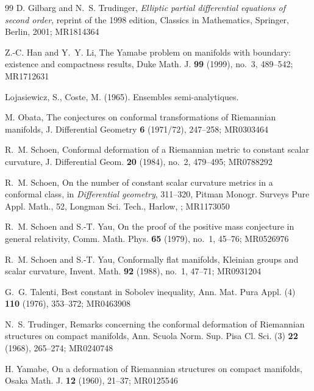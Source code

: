 \documentclass[12pt]{amsart}
\begin{document}
\begin{thebibliography}{99}
     D. Gilbarg and N.~S. Trudinger, {\it Elliptic partial differential equations of second order}, reprint of the 1998 edition, 
Classics in Mathematics, Springer, Berlin, 2001; MR1814364

     Z.-C. Han and Y.~Y. Li, The Yamabe problem on manifolds with boundary: existence and compactness results, Duke Math. J. {\bf 99} (1999), no.~3, 489--542; MR1712631

     Lojasiewicz, S.,  Coste, M. (1965). Ensembles semi-analytiques.

     M. Obata, The conjectures on conformal transformations of Riemannian manifolds, J. Differential Geometry {\bf 6} (1971/72), 247--258; MR0303464

     R.~M. Schoen, Conformal deformation of a Riemannian metric to constant scalar curvature, J. Differential Geom. {\bf 20} (1984), no.~2, 479--495; MR0788292

     R.~M. Schoen, On the number of constant scalar curvature metrics in a conformal class, in {\it Differential geometry}, 311--320, Pitman Monogr. Surveys Pure Appl. Math., 52, Longman Sci. Tech., Harlow, ; MR1173050

     R.~M. Schoen and S.-T. Yau, On the proof of the positive mass conjecture in general relativity, Comm. Math. Phys. {\bf 65} (1979), no.~1, 45--76; MR0526976

     R.~M. Schoen and S.-T. Yau, Conformally flat manifolds, Kleinian groups and scalar curvature, Invent. Math. {\bf 92} (1988), no.~1, 47--71; MR0931204

     G.~G. Talenti, Best constant in Sobolev inequality, Ann. Mat. Pura Appl. (4) {\bf 110} (1976), 353--372; MR0463908

     N.~S. Trudinger, Remarks concerning the conformal deformation of Riemannian structures on compact manifolds, Ann. Scuola Norm. Sup. Pisa Cl. Sci. (3) {\bf 22} (1968), 265--274; MR0240748

     H. Yamabe, On a deformation of Riemannian structures on compact manifolds, Osaka Math. J. {\bf 12} (1960), 21--37; MR0125546
	\end{thebibliography}
\end{document}
